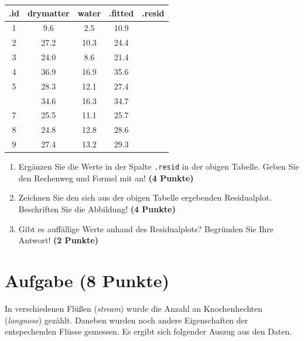 \documentclass[a4paper, 10pt]{scrartcl}\usepackage[]{graphicx}\usepackage[]{xcolor}
\newenvironment{knitrout}{}{} %
\begin{document}
\begin{knitrout}
\color{fgcolor}\begin{table}[!h]
\centering\begingroup\fontsize{12}{14}\selectfont

\begin{tabular}{ccccc}
\toprule
.id & drymatter & water & .fitted & .resid\\
\midrule
1 & 9.6 & 2.5 & 10.9 & \\
2 & 27.2 & 10.3 & 24.4 & \\
3 & 24.0 & 8.6 & 21.4 & \\
4 & 36.9 & 16.9 & 35.6 & \\
5 & 28.3 & 12.1 & 27.4 & \\
\addlinespace
6 & 34.6 & 16.3 & 34.7 & \\
7 & 25.5 & 11.1 & 25.7 & \\
8 & 24.8 & 12.8 & 28.6 & \\
9 & 27.4 & 13.2 & 29.3 & \\
\bottomrule
\end{tabular}
\endgroup{}
\end{table}

\end{knitrout}

\begin{enumerate}
\item Erg{\"a}nzen Sie die Werte in der Spalte \texttt{.resid} in der obigen
  Tabelle. Geben Sie den Rechenweg und Formel mit an! \textbf{(4 Punkte)}
\item Zeichnen Sie den sich aus der obigen Tabelle ergebenden
  Residualplot. Beschriften Sie die Abbildung! \textbf{(4 Punkte)}
\item Gibt es auff{\"a}llige Werte anhand des Residualplots? Begr{\"u}nden Sie Ihre
  Antwort! \textbf{(2 Punkte)}
\end{enumerate}
 
\clearpage

\section{Aufgabe \hfill (8 Punkte)}



In verschiedenen Fl{\"u}{\ss}en (\textit{stream}) wurde die Anzahl an
Knochenhechten (\textit{longnose}) gez{\"a}hlt. Daneben wurden noch andere
Eigenschaften der entspechenden Fl{\"u}sse gemessen. Es ergibt sich folgender
Auszug aus den Daten. 
\end{document}
